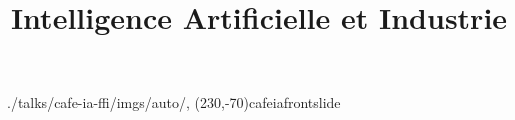 

\title{Intelligence Artificielle et Industrie}


\usefootlinefortitlepage

\begin{graphicspathcontext}{{./talks/cafe-ia-ffi/imgs/auto/},\old}
	\settitlepagerightfigure(230,-70){cafeiafrontslide}
\end{graphicspathcontext}




\endinput
